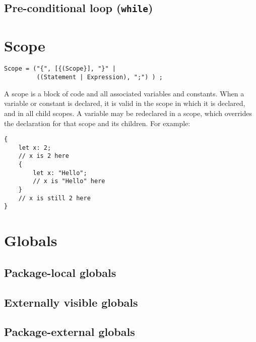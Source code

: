 \documentclass{article}
\begin{document}
\subsection{Pre-conditional loop (\texttt{while})}
\label{sub:statements:while}

\section{Scope}
\label{sec:scope}
\begin{verbatim}
Scope = ("{", [{(Scope}], "}" |
         ((Statement | Expression), ";") ) ;
\end{verbatim}
A scope is a block of code and all associated variables and constants. When a
variable or constant is declared, it is valid in the scope in which it is declared,
and in all child scopes. A variable may be redeclared in a scope, which overrides
the declaration for that scope and its children. For example:
\begin{verbatim}
{
    let x: 2;
    // x is 2 here
    {
        let x: "Hello";
        // x is "Hello" here
    }
    // x is still 2 here
}
\end{verbatim}

\section{Globals}
\label{sec:globals}

\subsection{Package-local globals}
\label{sub:globals:local}

\subsection{Externally visible globals}
\label{sub:globals:visible}

\subsection{Package-external globals}
\label{sub:globals:extern}
\end{document}
